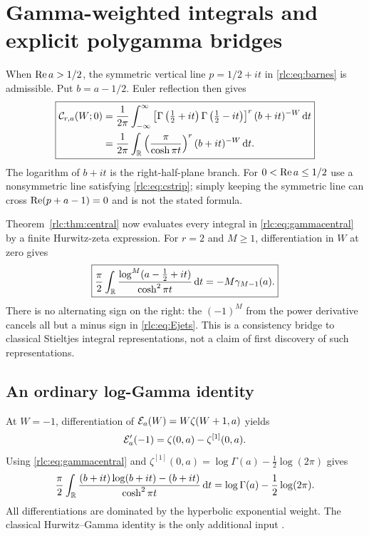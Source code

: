 \section{Gamma-weighted integrals and explicit polygamma bridges}
\label{rlc:sec:gamma}

When $\operatorname{Re} a>1/2$, the symmetric vertical line $p=1/2+it$ in
\eqref{rlc:eq:barnes} is admissible. Put $b=a-1/2$. Euler reflection
then gives
\begin{equation}\label{rlc:eq:gammacentral}
 \boxed{\displaystyle
 \begin{aligned}
 \mathcal C_{r,a}(W;0)&=\frac1{2\pi}\int_{-\infty}^{\infty}
 \left[\Gamma\left(\tfrac12+it\right)
       \Gamma\left(\tfrac12-it\right)\right]^r
 (b+it)^{-W}\,\mathrm d t\\
 &=\frac1{2\pi}\int_\mathbb R
      \left(\frac\pi{\cosh\pi t}\right)^r(b+it)^{-W}\,\mathrm d t.
 \end{aligned}}
\end{equation}
The logarithm of $b+it$ is the right-half-plane branch. For
$0<\operatorname{Re} a\le1/2$ use a nonsymmetric line satisfying
\eqref{rlc:eq:cstrip}; simply keeping the symmetric line can cross
$\operatorname{Re}(p+a-1)=0$ and is not the stated formula.

Theorem~\ref{rlc:thm:central} now evaluates every integral in
\eqref{rlc:eq:gammacentral} by a finite Hurwitz-zeta expression.
For $r=2$ and $M\ge1$, differentiation in $W$ at zero gives
\begin{equation}\label{rlc:eq:gammastieltjes}
 \boxed{\displaystyle
 \frac\pi2\int_\mathbb R
     \frac{\log^M(a-\tfrac12+it)}{\cosh^2\pi t}\,\mathrm d t
       =-M\gamma_{M-1}(a).}
\end{equation}
There is no alternating sign on the right: the $(-1)^M$ from the
power derivative cancels all but a minus sign in
\eqref{rlc:eq:Ejets}. This is a consistency bridge to classical
Stieltjes integral representations, not a claim of first discovery
of such representations.

\subsection{An ordinary log-Gamma identity}
At $W=-1$, differentiation of
$\mathcal E_a(W)=W\zeta(W+1,a)$ yields
\[
 \mathcal E_a'(-1)=\zeta(0,a)-\zeta^{[1]}(0,a).
\]
Using \eqref{rlc:eq:gammacentral} and
$\zeta^{[1]}(0,a)=\log\Gamma(a)-\tfrac12\log(2\pi)$ gives
\begin{equation}\label{rlc:eq:gammalog}
 \frac\pi2\int_\mathbb R\frac{
 (b+it)\log(b+it)-(b+it)}{\cosh^2\pi t}\,\mathrm d t
      =\log\Gamma(a)-\frac12\log(2\pi).
\end{equation}
All differentiations are dominated by the hyperbolic exponential
weight. The classical Hurwitz--Gamma identity is the only additional
input \cite{DLMF}.

